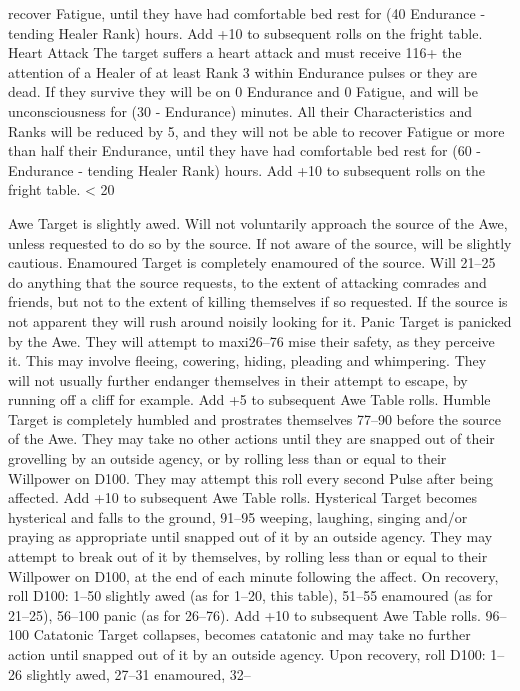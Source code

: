 \documentclass[a4paper]{article}
\begin{document}
\begin{multicols}{3}
recover Fatigue, until they have had comfortable bed rest for (40 Endurance - tending Healer Rank) hours. Add +10 to subsequent
rolls on the fright table.
Heart Attack The target suffers a heart attack and must receive
116+
the attention of a Healer of at least Rank 3 within Endurance
pulses or they are dead. If they survive they will be on 0 Endurance and 0 Fatigue, and will be unconsciousness for (30 - Endurance) minutes. All their Characteristics and Ranks will be reduced
by 5, and they will not be able to recover Fatigue or more than
half their Endurance, until they have had comfortable bed rest for
(60 - Endurance - tending Healer Rank) hours. Add +10 to subsequent rolls on the fright table.
< 20

Awe Target is slightly awed. Will not voluntarily approach the
source of the Awe, unless requested to do so by the source. If not
aware of the source, will be slightly cautious.
Enamoured Target is completely enamoured of the source. Will
21–25
do anything that the source requests, to the extent of attacking
comrades and friends, but not to the extent of killing themselves if
so requested. If the source is not apparent they will rush around
noisily looking for it.
Panic Target is panicked by the Awe. They will attempt to maxi26–76
mise their safety, as they perceive it. This may involve fleeing,
cowering, hiding, pleading and whimpering. They will not usually
further endanger themselves in their attempt to escape, by running
off a cliff for example. Add +5 to subsequent Awe Table rolls.
Humble Target is completely humbled and prostrates themselves
77–90
before the source of the Awe. They may take no other actions
until they are snapped out of their grovelling by an outside
agency, or by rolling less than or equal to their Willpower on
D100. They may attempt this roll every second Pulse after being
affected. Add +10 to subsequent Awe Table rolls.
Hysterical Target becomes hysterical and falls to the ground,
91–95
weeping, laughing, singing and/or praying as appropriate until
snapped out of it by an outside agency. They may attempt to
break out of it by themselves, by rolling less than or equal to their
Willpower on D100, at the end of each minute following the
affect. On recovery, roll D100: 1–50 slightly awed (as for 1–20,
this table), 51–55 enamoured (as for 21–25), 56–100 panic (as for
26–76). Add +10 to subsequent Awe Table rolls.
96–100 Catatonic Target collapses, becomes catatonic and may take no
further action until snapped out of it by an outside agency. Upon
recovery, roll D100: 1–26 slightly awed, 27–31 enamoured, 32–

\end{multicols}
\end{document}
